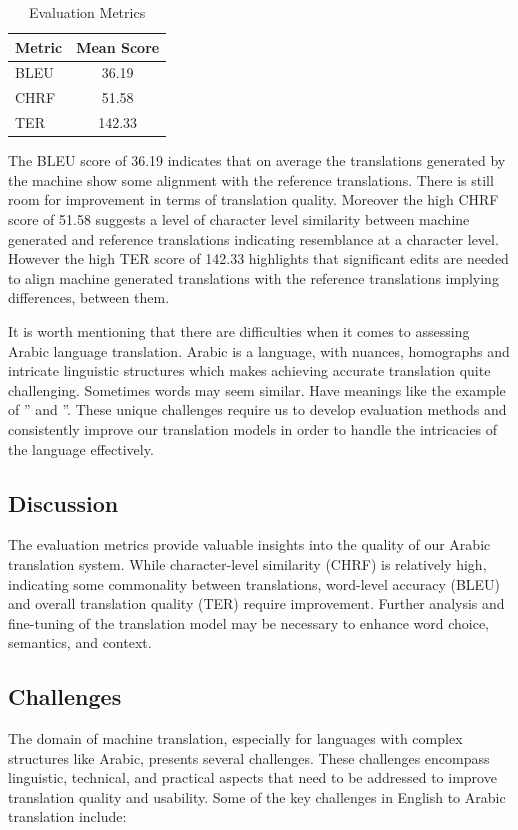 \documentclass[12pt]{article}
\begin{document}
\begin{table}[htb]
	\centering
	\begin{tabular}{|l|c|}
		\hline
		\textbf{Metric} & \textbf{Mean Score} \\
		\hline
		BLEU & 36.19 \\
		CHRF & 51.58 \\
		TER & 142.33 \\
		\hline
	\end{tabular}
	\caption{Evaluation Metrics}
	\label{tab:evaluation-metrics}
\end{table}

The BLEU score of 36.19 indicates that on average the translations generated by the machine show some alignment with the reference translations. There is still room for improvement in terms of translation quality. Moreover the high CHRF score of 51.58 suggests a level of character level similarity between machine generated and reference translations indicating resemblance at a character level. However the high TER score of 142.33 highlights that significant edits are needed to align machine generated translations with the reference translations implying differences, between them.

It is worth mentioning that there are difficulties when it comes to assessing Arabic language translation. Arabic is a language, with nuances, homographs and intricate linguistic structures which makes achieving accurate translation quite challenging. Sometimes words may seem similar. Have meanings like the example of '' and ''. These unique challenges require us to develop evaluation methods and consistently improve our translation models in order to handle the intricacies of the language effectively.

\subsection{Discussion}

The evaluation metrics provide valuable insights into the quality of our Arabic translation system. While character-level similarity (CHRF) is relatively high, indicating some commonality between translations, word-level accuracy (BLEU) and overall translation quality (TER) require improvement. Further analysis and fine-tuning of the translation model may be necessary to enhance word choice, semantics, and context.


\subsection{Challenges}
The domain of machine translation, especially for languages with complex structures like Arabic, presents several challenges. These challenges encompass linguistic, technical, and practical aspects that need to be addressed to improve translation quality and usability. Some of the key challenges in English to Arabic translation include:
\end{document}
